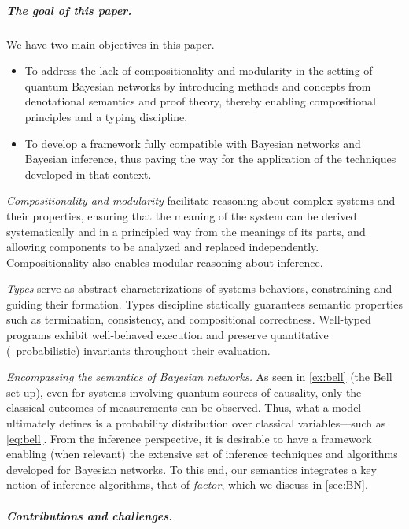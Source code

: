 \subparagraph{The goal of this paper.}

We have two main objectives in this paper.
\begin{itemize}
\item
To address the lack of compositionality and modularity in the setting of quantum Bayesian networks by introducing methods and concepts from denotational semantics and proof theory, thereby enabling compositional principles and a typing discipline.
\item
To develop a framework fully compatible with Bayesian networks and Bayesian inference, thus paving the way for the application of the techniques developed in that context.
\end{itemize}

\emph{Compositionality and modularity} facilitate reasoning about complex systems and their properties, ensuring that the meaning of the system can be derived systematically and in a principled way from the meanings of its parts, and allowing components to be analyzed and replaced independently.
Compositionality also enables modular reasoning about inference.

\emph{Types} serve as abstract characterizations of systems behaviors, constraining and guiding their formation.
Types discipline statically guarantees semantic properties such as termination, consistency, and compositional correctness.
Well-typed programs exhibit well-behaved execution and preserve quantitative (\eg\ probabilistic) invariants throughout their evaluation.

\emph{Encompassing the semantics of Bayesian networks.}
As seen in \cref{ex:bell} (the Bell set-up), even for systems involving quantum sources of causality, only the classical outcomes of measurements can be observed.
Thus, what a model ultimately defines is a probability distribution over classical variables---such as \cref{eq:bell}.
From the inference perspective, it is desirable to have a framework enabling (when relevant) the extensive set of inference techniques and algorithms developed for Bayesian networks.
To this end, our semantics integrates a key notion of inference algorithms, that of \emph{factor}, which we discuss in \cref{sec:BN}.

\subparagraph{Contributions and challenges.}

